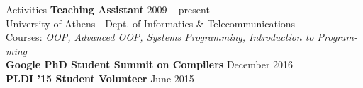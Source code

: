 \documentclass[a4paper]{resume}
\newcommand{\tl}{\textlatin}
\newcommand{\dual}[2]{\tl{#1}} %
\begin{document}

\begin{rSection}{\dual{Activities}{Δραστηριοτητες}}
  {\bf\dual{Teaching Assistant}{Υποστήριξη Μαθήματος}} \hfill {2009 -- \dual{present}{παρόν}} \\
  \dual{University of Athens - Dept. of Informatics \& Telecommunications}
  {Πανεπιστήμιο ΑΘηνών - Τμήμα Πληροφορικής \& Τηλεπικοινωνιών} \\
  \dual{Courses: \emph{OOP, Advanced OOP, Systems Programming, Introduction to Programming}}
  {Μαθήματα: \emph{\tl{OOP}, Προηγμένα Θέματα \tl{OOP}, Προγρ. Συστήματος, Εισαγωγή στον Προγραμματισμό}} \\
  {\bf\tl{Google PhD Student Summit on Compilers}} \hfill {\dual{December}{Δεκέμβριος} 2016} \\
  {\bf\tl{PLDI '15 Student Volunteer}} \hfill {\dual{June}{Ιούνιος} 2015} \\
\end{rSection}
\end{document}
